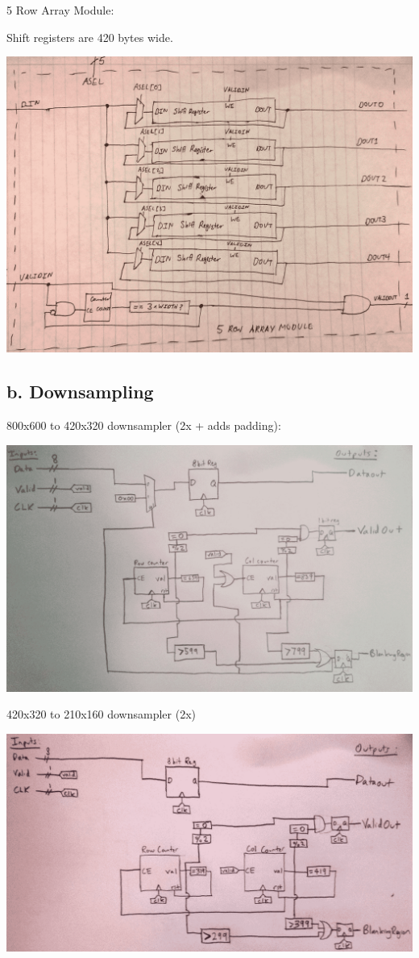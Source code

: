\documentclass[11pt]{article}
\begin{document}
5 Row Array Module:

Shift registers are 420 bytes wide.

\noindent\includegraphics[width=\textwidth]{modules/proc5row.png}

\subsection*{b. Downsampling}

800x600 to 420x320 downsampler (2x + adds padding):

\noindent\includegraphics[width=\textwidth]{modules/procdownsampler2x.png}

420x320 to 210x160 downsampler (2x)

\noindent\includegraphics[width=\textwidth]{modules/procdownsampler2x_simple.png}
\end{document}
